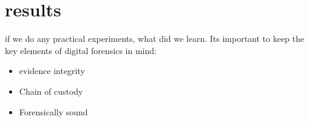 \section{results}
if we do any practical experiments, what did we learn.
Its important to keep the key elements of digital forensics in mind:
\begin{itemize}
\item evidence integrity
\item Chain of custody
\item Forensically sound
\end{itemize}

